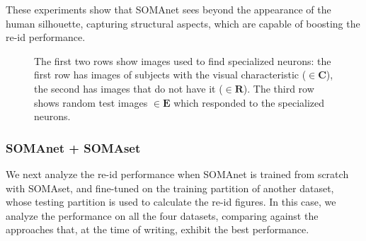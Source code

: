 \documentclass[10pt,journal,letterpaper,compsoc]{IEEEtran}
\begin{document}
These experiments show that SOMAnet sees beyond the appearance of the human silhouette, capturing structural aspects, which are capable of boosting the re-id performance.



\begin{figure}[!htb]
  \centering
   \vspace{-0.1cm}%
  \hfill \addtocounter{subfigure}{2}
  \vspace{-0.1cm}
  \addtocounter{subfigure}{-3}
  \vspace{-0.1cm}%
  \hfill  \addtocounter{subfigure}{2}
  \vspace{-0.1cm}
  \addtocounter{subfigure}{-3}
  \vspace{-0.1cm}%
  \hfill \addtocounter{subfigure}{2}
  \vspace{-0.1cm}

  \caption{The first two rows show images used to find specialized neurons: the first row has images of subjects with the visual characteristic ($\in \mathbf{C}$), the second has images that do not have it  ($\in \mathbf{R}$). The third row shows random test images $\in \mathbf{E}$ which responded to the specialized neurons.
  }
  \label{fig:tall_obese}
\end{figure}


\subsubsection{SOMAnet + SOMAset}\label{Sec:topexp}
We next analyze the re-id performance when SOMAnet is trained from scratch with SOMAset, and fine-tuned on the training partition of another dataset, whose testing partition is used to calculate the re-id figures.
In this case, we analyze the performance on all the four datasets, comparing against the approaches that, at the time of writing, exhibit the best performance.
\end{document}

